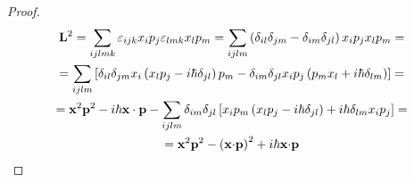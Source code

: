 \documentclass{tstextbook}
\begin{document}
\begin{proof}
\begin{gather*}{\bf L}^{2}=\sum_{i j l m k}\varepsilon_{i j k}x_{i}p_{j}\varepsilon_{l m k}x_{l}p_{m}=\sum_{i j l m}\left( \delta_{i l}\delta_{j m}-\delta_{i m}\delta_{j l} \right)x_{i}p_{j}x_{l}p_{m}=\\=\sum_{i j l m}\left[ \delta_{i l}\delta_{j m}x_{i}\left( x_{l}p_{j}-i\hbar\delta_{j l} \right)p_{m}-\delta_{i m}\delta_{j l}x_{i}p_{j}\left( p_{m}x_{l}+i\hbar\delta_{l m} \right) \right]=\\={\bf x}^{2}{\bf p}^{2}-i\hbar{\bf x}\cdot{\bf p}-\sum_{i j l m}\delta_{i m}\delta_{j l}\left[ x_{i}p_{m}\left( x_{l}p_{j}-i\hbar\delta_{j l} \right)+i\hbar\delta_{l m}x_{i}p_{j} \right]= \\=\mathbf{x}^{2}\mathbf{p}^{2}-\left(\mathbf{x}{\cdot}\mathbf{p}\right)^{2}+i\hbar\mathbf{x}{\cdot}\mathbf{p}
\end{gather*}

\end{proof}
\end{document}
